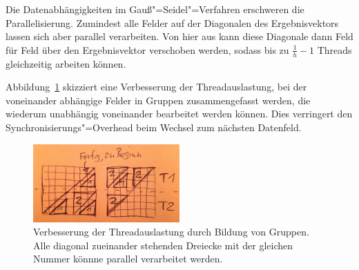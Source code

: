 \documentclass[paper = a4]{scrartcl}
\begin{document}


Die Datenabhängigkeiten im Gauß"=Seidel"=Verfahren erschweren die Parallelisierung. Zumindest alle Felder auf der Diagonalen des Ergebnisvektors lassen sich aber parallel verarbeiten. Von hier aus kann diese Diagonale dann Feld für Feld über den Ergebnisvektor verschoben werden, sodass bis zu \(\frac{1}{h} - 1\) Threads gleichzeitig arbeiten können.


Abbildung~\ref{fig:gaussseideldreiecke} skizziert eine Verbesserung der Threadauslastung, bei der voneinander abhängige Felder in Gruppen zusammengefasst werden, die wiederum unabhängig voneinander bearbeitet werden können. Dies verringert den Synchronisierungs"=Overhead beim Wechsel zum nächsten Datenfeld.

\begin{figure}
    \centering
    \includegraphics[width=0.5\textwidth]{gaussseideldreiecke}
    \caption{Verbesserung der Threadauslastung durch Bildung von Gruppen. Alle diagonal zueinander stehenden Dreiecke mit der gleichen Nummer könnne parallel verarbeitet werden.}
    \label{fig:gaussseideldreiecke}
\end{figure}
\end{document}
